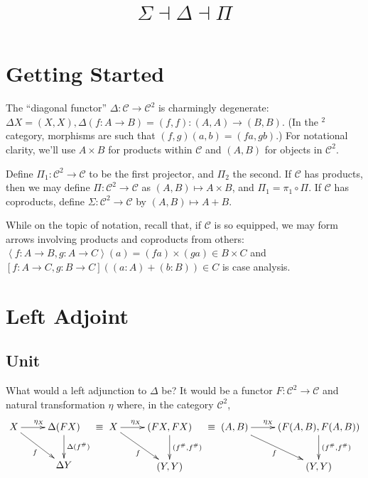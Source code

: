 \documentclass[letterpaper]{article}
\title{$\Sigma \dashv \Delta \dashv \Pi$}
\newcommand{\brak}[1]{\left[{#1}\right]}
\newcommand{\ang}[1]{\left\langle{#1}\right\rangle}
\begin{document}
\maketitle

\section{Getting Started}

The ``diagonal functor'' $\Delta : \mathcal{C} \to \mathcal{C}^2$ is
charmingly degenerate:
$\Delta X = (X,X), \Delta (f : A \to B) = (f,f) : (A,A) \to (B,B)$.
(In the ${}^2$ category, morphisms are such that $(f,g)(a,b) = (f a,g b)$.)
For notational clarity, we'll use $A \times B$ for products within
$\mathcal{C}$ and $(A,B)$ for objects in $\mathcal{C}^2$. 

Define $\Pi_1 : \mathcal{C}^2 \to \mathcal{C}$ to be the first
projector, and $\Pi_2$ the second.  If $\mathcal{C}$ has
products, then we may define $\Pi : \mathcal{C}^2 \to \mathcal{C}$ as
$(A,B) \mapsto A \times B$, and $\Pi_1 = \pi_1 \circ \Pi$.
If $\mathcal{C}$ has coproducts, define $\Sigma : \mathcal{C}^2 \to
\mathcal{C}$ by $(A,B) \mapsto A + B$.

While on the topic of notation, recall that, if $\mathcal{C}$ is so
equipped, we may form arrows involving products and coproducts from others:
$\ang{f : A \to B,g : A \to C}(a) = (f a) \times (g a) \in B \times C$ and
$\brak{f : A \to C,g : B \to C}((a : A) + (b : B)) \in C$ is case analysis.

\section{Left Adjoint}
\subsection{Unit}

What would a left adjunction to $\Delta$ be?  It would be a functor $F :
\mathcal{C}^2 \to \mathcal{C}$ and natural transformation $\eta$ where, in
the category $\mathcal{C}^2$,
\[ \xymatrix{
	X \ar[r]^{\eta_X} \ar[rd]_{f} & \Delta (F X) \ar[d]^{\Delta (f^\#)} \\
                                  & \Delta Y
} \equiv \xymatrix {
	X \ar[r]^(.4){\eta_X} \ar[rd]_{f} & (F X, F X) \ar[d]^{(f^\#, f^\#)} \\
                                  & (Y, Y)
} \equiv \xymatrix {
	(A,B) \ar[r]^(.4){\eta_X} \ar[rd]_{f} & (F (A,B), F (A,B)) \ar[d]^{(f^\#, f^\#)} \\
                                  & (Y, Y)
}  \]
\end{document}

